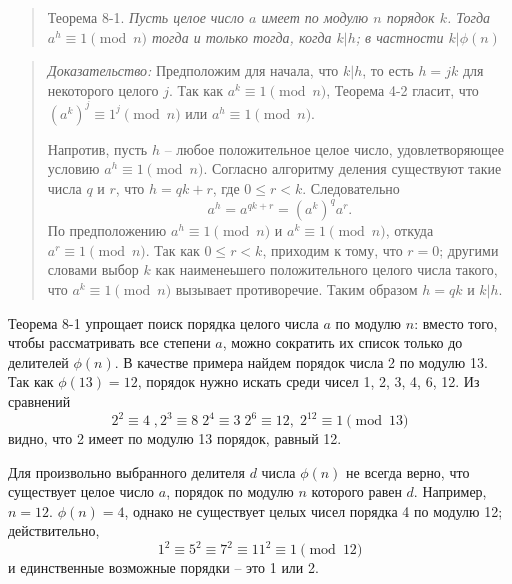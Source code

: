 \documentclass[11pt]{article}
\begin{document}
\begin{quote}
	\large{Теорема 8-1}. \it Пусть целое число $a$ имеет по модулю $n$ порядок $k$. Тогда $a^h\equiv1\pmod{n}$ тогда и только тогда, когда $k|h$; в частности $k|\phi(n)$
\end{quote}
\newpage
\begin{quote}
	\emph{Доказательство:} Предположим для начала, что $k|h$, то есть $h=jk$ для некоторого целого $j$. Так как $a^k\equiv1\pmod{n}$, Теорема 4-2 гласит, что $(a^k)^j\equiv1^j\pmod{n}$ или $a^h\equiv1\pmod{n}$.
	
	Напротив, пусть $h$ -- любое положительное целое число, удовлетворяющее условию $a^h\equiv1\pmod{n}$. Согласно алгоритму деления существуют такие числа $q$ и $r$, что $h=qk+r$, где $0\leq{r}<k$. Следовательно $$a^h=a^{qk+r}=(a^k)^qa^r.$$	
	По предположению $a^h\equiv1\pmod{n}$ и $a^k\equiv1\pmod{n}$, откуда $a^r\equiv1\pmod{n}$. Так как $0\leq{r}<k$, приходим к тому, что $r=0$; другими словами выбор $k$ как наименеьшего положительного целого числа такого, что $a^k\equiv1\pmod{n}$ вызывает противоречие. Таким образом $h=qk$ и $k|h$.
\end{quote}

Теорема 8-1 упрощает поиск порядка целого числа $a$ по модулю $n$: вместо того, чтобы рассматривать все степени $a$, можно сократить их список только до  делителей $\phi(n)$. В качестве примера найдем порядок числа 2 по модулю 13. Так как $\phi(13)=12$, порядок нужно искать среди чисел 1, 2, 3, 4, 6, 12. Из сравнений $$2^2\equiv4\;,2^3\equiv8\;2^4\equiv3\;2^6\equiv12,\;2^{12}\equiv1\pmod{13}$$ видно, что 2 имеет по модулю 13 порядок, равный 12.

Для произвольно выбранного делителя $d$ числа $\phi(n)$ не всегда верно, что существует целое число $a$, порядок по модулю $n$ которого равен $d$. Например, $n=12$. $\phi(n)=4$, однако не существует целых чисел порядка 4 по модулю 12; действительно, $$1^2\equiv5^2\equiv7^2\equiv11^2\equiv1\pmod{12}$$ и единственные возможные порядки -- это 1 или 2.
\end{document}

